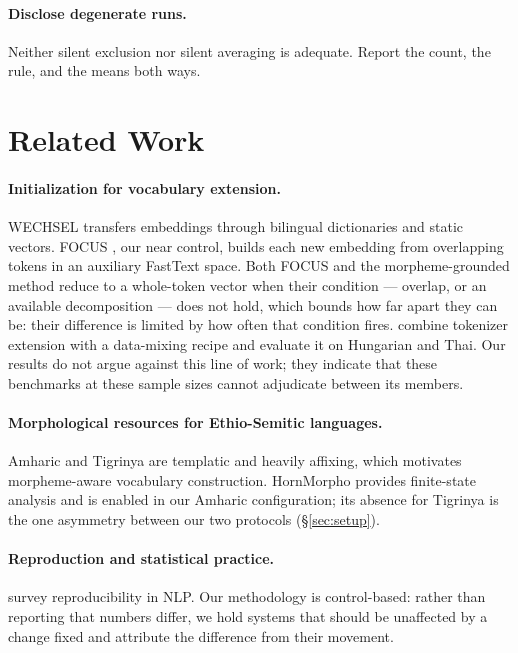\documentclass[11pt]{article}
\begin{document}
\paragraph{Disclose degenerate runs.} Neither silent exclusion nor silent
averaging is adequate. Report the count, the rule, and the means both ways.

\section{Related Work}

\paragraph{Initialization for vocabulary extension.} WECHSEL
\citep{minixhofer-etal-2022-wechsel} transfers embeddings through bilingual
dictionaries and static vectors. FOCUS \citep{dobler-de-melo-2023-focus},
our near control, builds each new embedding from overlapping tokens in an
auxiliary FastText space. Both FOCUS and the morpheme-grounded method reduce
to a whole-token vector when their condition --- overlap, or an available
decomposition --- does not hold, which bounds how far apart they can be:
their difference is limited by how often that condition fires.
\citet{csaki-etal-2023-efficiently} combine tokenizer extension with a
data-mixing recipe and evaluate it on Hungarian and Thai. Our results do not
argue against this line of work; they indicate that these benchmarks at these
sample sizes cannot adjudicate between its members.

\paragraph{Morphological resources for Ethio-Semitic languages.} Amharic and
Tigrinya are templatic and heavily affixing, which motivates morpheme-aware
vocabulary construction. HornMorpho
\citep{gasser-2011-hornmorpho} provides finite-state analysis and is enabled
in our Amharic configuration; its absence for Tigrinya is the one asymmetry
between our two protocols (\S\ref{sec:setup}).

\paragraph{Reproduction and statistical practice.}
\citet{belz-etal-2021-systematic} survey reproducibility in NLP. Our
methodology is control-based: rather than reporting that numbers differ, we
hold systems that should be unaffected by a change fixed and attribute the
difference from their movement.
\end{document}
